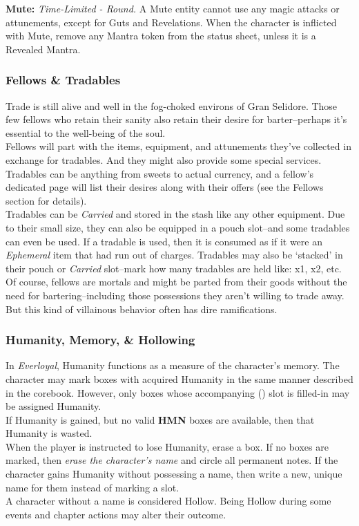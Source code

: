 \documentclass[12pt]{article}
\begin{document}
\begin{multicols*}{2}
\textbf{Mute:} \emph{Time-Limited - Round.} A Mute entity cannot use any magic attacks or attunements, except for Guts and Revelations. When the character is inflicted with Mute, remove any Mantra token from the status sheet, unless it is a Revealed Mantra.

\subsubsection{Fellows \& Tradables}
Trade is still alive and well in the fog-choked environs of Gran Selidore. Those few fellows who retain their sanity also retain their desire for barter--perhaps it’s essential to the well-being of the soul.\\
Fellows will part with the items, equipment, and attunements they’ve collected in exchange for tradables. And they might also provide some special services. Tradables can be anything from sweets to actual currency, and a fellow’s dedicated page will list their desires along with their offers (see the Fellows section for details).\\
Tradables can be \emph{Carried} and stored in the stash like any other equipment. Due to their small size, they can also be equipped in a pouch slot--and some tradables can even be used. If a tradable is used, then it is consumed as if it were an \emph{Ephemeral} item that had run out of charges. Tradables may also be ‘stacked’ in their pouch or \emph{Carried} slot--mark how many tradables are held like: x1, x2, etc.\\
Of course, fellows are mortals and might be parted from their goods without the need for bartering--including those possessions they aren’t willing to trade away. But this kind of villainous behavior often has dire ramifications.

\subsubsection{Humanity, Memory, \& Hollowing}
\hypertarget{HMN}{}\hypertarget{MEM}{}
In \emph{Everloyal}, Humanity functions as a measure of the character’s memory. The character may mark  boxes with acquired Humanity in the same manner described in the corebook. However, only  boxes whose accompanying  () slot is filled-in may be assigned Humanity.\\
If Humanity is gained, but no valid \textbf{HMN} boxes are available, then that Humanity is wasted.\\
When the player is instructed to lose Humanity, erase a  box. If no  boxes are marked, then \emph{erase the character’s name} and circle all permanent notes. If the character gains Humanity without possessing a name, then write a new, unique name for them instead of marking a  slot.\\
A character without a name is considered Hollow. Being Hollow during some events and chapter actions may alter their outcome.


\end{multicols*}
\end{document}
